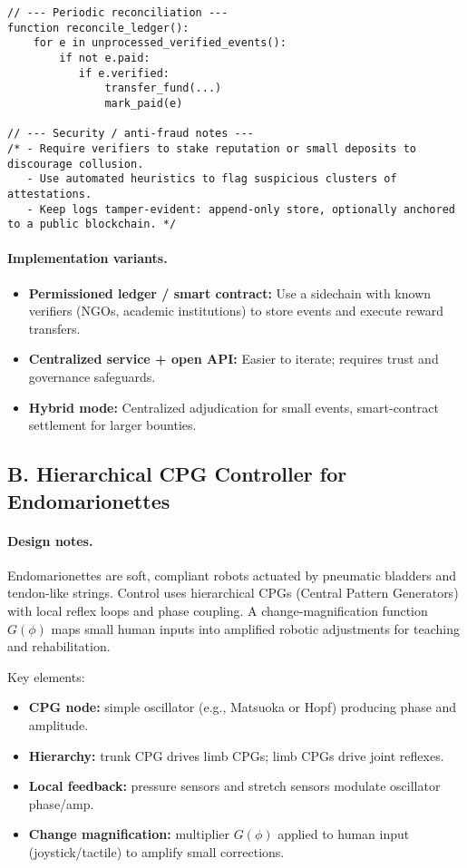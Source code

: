 \documentclass[12pt]{article}
\begin{document}
\begin{verbatim}
// --- Periodic reconciliation ---
function reconcile_ledger():
    for e in unprocessed_verified_events():
        if not e.paid:
           if e.verified:
               transfer_fund(...)
               mark_paid(e)

// --- Security / anti-fraud notes ---
/* - Require verifiers to stake reputation or small deposits to discourage collusion.
   - Use automated heuristics to flag suspicious clusters of attestations.
   - Keep logs tamper-evident: append-only store, optionally anchored to a public blockchain. */
\end{verbatim}

\paragraph{Implementation variants.}
\begin{itemize}
  \item \textbf{Permissioned ledger / smart contract:} Use a sidechain with known verifiers (NGOs, academic institutions) to store events and execute reward transfers.
  \item \textbf{Centralized service + open API:} Easier to iterate; requires trust and governance safeguards.
  \item \textbf{Hybrid mode:} Centralized adjudication for small events, smart-contract settlement for larger bounties.
\end{itemize}

\subsection{B. Hierarchical CPG Controller for Endomarionettes}
\paragraph{Design notes.}
Endomarionettes are soft, compliant robots actuated by pneumatic bladders and tendon-like strings. Control uses hierarchical CPGs (Central Pattern Generators) with local reflex loops and phase coupling. A change-magnification function \(G(\phi)\) maps small human inputs into amplified robotic adjustments for teaching and rehabilitation.

Key elements:
\begin{itemize}
  \item \textbf{CPG node:} simple oscillator (e.g., Matsuoka or Hopf) producing phase and amplitude.
  \item \textbf{Hierarchy:} trunk CPG drives limb CPGs; limb CPGs drive joint reflexes.
  \item \textbf{Local feedback:} pressure sensors and stretch sensors modulate oscillator phase/amp.
  \item \textbf{Change magnification:} multiplier \(G(\phi)\) applied to human input (joystick/tactile) to amplify small corrections.
\end{itemize}
\end{document}
